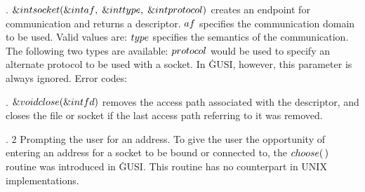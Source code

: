 . \CD{}$\&{int}\ \\{socket}(\&{int}\ \\{af},\;\&{int}\ \\{type},\;\&{int}\ %
\\{protocol})$\DC{} creates an endpoint for communication
and returns a descriptor. \CD{}$\\{af}$\DC{} specifies the communication domain
to be used. Valid
values are:
\medskip{}
\medskip
\CD{}$\\{type}$\DC{} specifies the semantics of the communication. The
following two types are
available:
\medskip{}
\medskip
\CD{}$\\{protocol}$\DC{} would be used to specify an alternate protocol to be
used with a socket.
In \.{GUSI}, however, this parameter is always ignored.
\medskip
Error codes:
\medskip{}

\fi

. \CD{}$\&{void}\ \\{close}(\&{int}\ \\{fd})$\DC{} removes the access path
associated with the descriptor, and
closes the file or socket if the last access path referring to it was removed.

\fi

. 2 Prompting the user for an address. To give the user the opportunity of
entering
an address for a socket to be bound or connected to, the \CD{}$\\{choose}(\,)$%
\DC{} routine was
introduced in \.{GUSI}. This routine has no counterpart in UNIX
implementations.

